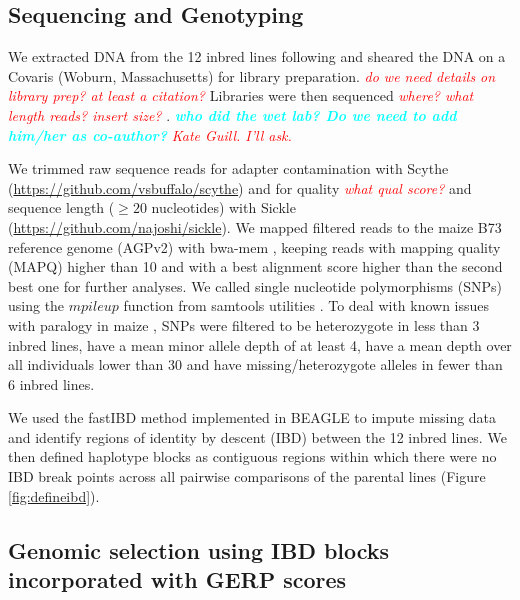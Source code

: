\documentclass[9pt,twocolumn,twoside]{gsajnl}
\newcommand{\yang}[1]{\textcolor{cyan}{\emph{\bf  #1}} }
\newcommand{\jri}[1]{\textcolor{red}{ \emph{ #1}} }
\begin{document}
\subsection*{Sequencing and Genotyping}

We extracted DNA from the 12 inbred lines following \citet{Doyle1987} and sheared the DNA on a Covaris (Woburn, Massachusetts) for library preparation. \jri{do we need details on library prep? at least a citation?}
Libraries were then sequenced \jri{where? what length reads? insert size?}. \yang{who did the wet lab? Do we need to add him/her as co-author?} \DIFaddbegin \jri{Kate Guill. I'll ask.}
\DIFaddend 

We trimmed raw sequence reads for adapter contamination with Scythe  (\url{https://github.com/vsbuffalo/scythe}) and for quality \DIFaddbegin \jri{what qual score?} \DIFaddend and sequence length ($\geq 20$ nucleotides) with Sickle (\url{https://github.com/najoshi/sickle}). 
We mapped filtered reads to the maize B73 reference genome (AGPv2) with bwa-mem \citep{Li2009B}, keeping reads with mapping quality (MAPQ) higher than 10 and with a best alignment score higher than the second best one for further analyses.
We called single nucleotide polymorphisms (SNPs) using the $mpileup$ function from \DIFaddbegin {}\DIFaddend samtools utilities \citep{Li2009}. 
To deal with known issues with paralogy in maize \citep{Chia2012}, SNPs were filtered to be heterozygote in less than 3 inbred lines, have a mean minor allele depth of at least 4, have a mean depth over all individuals lower than 30 and have missing/heterozygote alleles in fewer than 6 inbred lines. 

We used the fastIBD method implemented in BEAGLE \citep{Browning2009} to impute missing data and identify regions of identity by descent (IBD) between the 12 inbred lines. 
We then defined haplotype blocks as contiguous regions within which there were no IBD break points across all pairwise comparisons of the parental lines (Figure \ref{fig:defineibd}). \DIFaddbegin {}\DIFaddend 




\subsection*{Genomic selection using IBD blocks incorporated with GERP scores}
\end{document}
